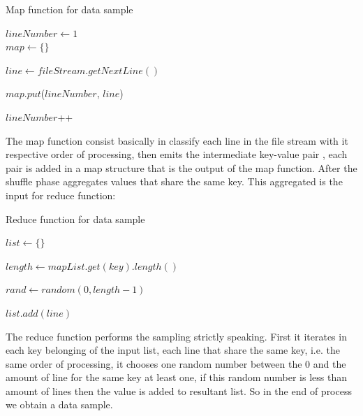 \begin{algorithm}
		\caption{Map function for data sample \label{alg:map}}


		$lineNumber \leftarrow 1$\\
		$map \leftarrow  \{\}$

		 {

			$line \leftarrow fileStream.getNextLine()$

			$map.put$($lineNumber$, $line$)

			$lineNumber$++

		}

\end{algorithm}

The map function consist basically in classify each line in the file stream with
it respective order of processing, then emits the intermediate key-value pair ,
each pair is added in a map structure that is the output of the map function. After
the shuffle phase aggregates values that share the same key. This aggregated is
the input for reduce function:

\begin{algorithm}
		\caption{Reduce function for data sample \label{alg:reduce}}


		$list \leftarrow  \{\}$

		 {

			$length \leftarrow mapList.get(key).length()$

			 {
				$rand \leftarrow random(0, length - 1)$

				 {
					$list.add(line)$
				}

			}

		}

\end{algorithm}

The reduce function performs the sampling strictly speaking. First it iterates in
each key belonging of the input list, each line that share the same key, i.e. the
same order of processing, it chooses one random number between the 0 and the amount
of line for the same key at least one, if this random number is less than amount
of lines then the value is added to resultant list. So in the end of process we
obtain a data sample.

